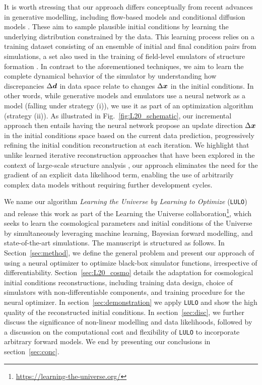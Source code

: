 It is worth stressing that our approach differs conceptually from recent advances in generative modelling, including flow-based models and conditional diffusion models \citep{Legin2023,Holzschuh2024}. These aim to sample plausible initial conditions by learning the underlying distribution constrained by the data. This learning process relies on a training dataset consisting of an ensemble of initial and final condition pairs from simulations, a set also used in the training of field-level emulators of structure formation \citep{He2019,AlvesDeOliveira,Bernardini2020,Kaushal,Jamieson2022b, Jamieson2024}. In contrast to the aforementioned techniques, we aim to learn the complete dynamical behavior of the simulator by understanding how discrepancies $\Delta \boldsymbol{d}$ in data space relate to changes $\Delta \boldsymbol{x}$ in the initial conditions. In other words, while generative models and emulators use a neural network as a model (falling under strategy (i)), we use it as part of an optimization algorithm (strategy (ii)). As illustrated in Fig.~\ref{fig:L20_schematic}, our incremental approach then entails having the neural network propose an update direction $\Delta \boldsymbol{x}$ in the initial conditions space based on the current data prediction, progressively refining the initial condition reconstruction at each iteration. We highlight that unlike learned iterative reconstruction approaches \citep[see e.g.][]{Putzky2017,Adler2017} that have been explored in the context of large-scale structure analysis \citep{Modi2021}, our approach eliminates the need for the gradient of an explicit data likelihood term, enabling the use of arbitrarily complex data models without requiring further development cycles.

We name our algorithm \textit{Learning the Universe by Learning to Optimize} (\texttt{LULO}) and release this work as part of the Learning the Universe collaboration\footnote{\href{https://learning-the-universe.org/}{https://learning-the-universe.org/}}, which seeks to learn the cosmological parameters and initial conditions of the Universe by simultaneously leveraging machine learning, Bayesian forward modelling, and state-of-the-art simulations. The manuscript is structured as follows. In Section~\ref{sec:method}, we define the general problem and present our approach of using a neural optimizer to optimize black-box simulator functions, irrespective of differentiability. Section~\ref{sec:L20_cosmo} details the adaptation for cosmological initial conditions reconstructions, including training data design, choice of simulators with non-differentiable components, and training procedure for the neural optimizer. In section~\ref{sec:demonstration} we apply \texttt{LULO} and show the high quality of the reconstructed initial conditions. In section~\ref{sec:disc}, we further discuss the significance of non-linear modelling and data likelihoods, followed by a discussion on the computational cost and flexibility of \texttt{LULO} to incorporate arbitrary forward models. We end by presenting our conclusions in section~\ref{sec:conc}.
